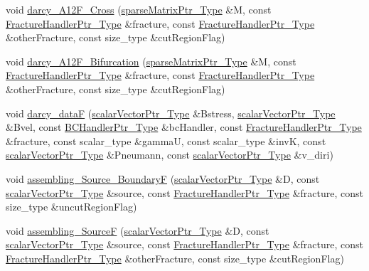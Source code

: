 \begin{DoxyCompactItemize}
\item 
void \hyperlink{namespacegetfem_a88df6c0cb0765d5ab0fae27679cd30f4}{darcy\-\_\-\-A12\-F\-\_\-\-Cross} (\hyperlink{Core_8h_a87137a9501b38c724ac80bc955164bb7}{sparse\-Matrix\-Ptr\-\_\-\-Type} \&M, const \hyperlink{FractureHandler_8h_af23fb7a30aaff864bd42587af4f1e78a}{Fracture\-Handler\-Ptr\-\_\-\-Type} \&fracture, const \hyperlink{FractureHandler_8h_af23fb7a30aaff864bd42587af4f1e78a}{Fracture\-Handler\-Ptr\-\_\-\-Type} \&other\-Fracture, const size\-\_\-type \&cut\-Region\-Flag)
\item 
void \hyperlink{namespacegetfem_a8ec373049ba9d4784a98751bc4134221}{darcy\-\_\-\-A12\-F\-\_\-\-Bifurcation} (\hyperlink{Core_8h_a87137a9501b38c724ac80bc955164bb7}{sparse\-Matrix\-Ptr\-\_\-\-Type} \&M, const \hyperlink{FractureHandler_8h_af23fb7a30aaff864bd42587af4f1e78a}{Fracture\-Handler\-Ptr\-\_\-\-Type} \&fracture, const \hyperlink{FractureHandler_8h_af23fb7a30aaff864bd42587af4f1e78a}{Fracture\-Handler\-Ptr\-\_\-\-Type} \&other\-Fracture, const size\-\_\-type \&cut\-Region\-Flag)
\item 
void \hyperlink{namespacegetfem_ad6e90b309c01f6b4fc91c9369cba376a}{darcy\-\_\-data\-F} (\hyperlink{Core_8h_ab09b6fa3c23db1b8c60456f8690c44a7}{scalar\-Vector\-Ptr\-\_\-\-Type} \&Bstress, \hyperlink{Core_8h_ab09b6fa3c23db1b8c60456f8690c44a7}{scalar\-Vector\-Ptr\-\_\-\-Type} \&Bvel, const \hyperlink{BCHandler_8h_aa175884cb453788647f17f2230a2a762}{B\-C\-Handler\-Ptr\-\_\-\-Type} \&bc\-Handler, const \hyperlink{FractureHandler_8h_af23fb7a30aaff864bd42587af4f1e78a}{Fracture\-Handler\-Ptr\-\_\-\-Type} \&fracture, const scalar\-\_\-type \&gamma\-U, const scalar\-\_\-type \&inv\-K, const \hyperlink{Core_8h_ab09b6fa3c23db1b8c60456f8690c44a7}{scalar\-Vector\-Ptr\-\_\-\-Type} \&Pneumann, const \hyperlink{Core_8h_ab09b6fa3c23db1b8c60456f8690c44a7}{scalar\-Vector\-Ptr\-\_\-\-Type} \&v\-\_\-diri)
\item 
void \hyperlink{namespacegetfem_ac08fe08fb325eede94ffe4968b7980de}{assembling\-\_\-\-Source\-\_\-\-Boundary\-F} (\hyperlink{Core_8h_ab09b6fa3c23db1b8c60456f8690c44a7}{scalar\-Vector\-Ptr\-\_\-\-Type} \&D, const \hyperlink{Core_8h_ab09b6fa3c23db1b8c60456f8690c44a7}{scalar\-Vector\-Ptr\-\_\-\-Type} \&source, const \hyperlink{FractureHandler_8h_af23fb7a30aaff864bd42587af4f1e78a}{Fracture\-Handler\-Ptr\-\_\-\-Type} \&fracture, const size\-\_\-type \&uncut\-Region\-Flag)
\item 
void \hyperlink{namespacegetfem_a5efeefe94dfb5427c3ecf63d0b342c57}{assembling\-\_\-\-Source\-F} (\hyperlink{Core_8h_ab09b6fa3c23db1b8c60456f8690c44a7}{scalar\-Vector\-Ptr\-\_\-\-Type} \&D, const \hyperlink{Core_8h_ab09b6fa3c23db1b8c60456f8690c44a7}{scalar\-Vector\-Ptr\-\_\-\-Type} \&source, const \hyperlink{FractureHandler_8h_af23fb7a30aaff864bd42587af4f1e78a}{Fracture\-Handler\-Ptr\-\_\-\-Type} \&fracture, const \hyperlink{FractureHandler_8h_af23fb7a30aaff864bd42587af4f1e78a}{Fracture\-Handler\-Ptr\-\_\-\-Type} \&other\-Fracture, const size\-\_\-type \&cut\-Region\-Flag)

\end{DoxyCompactItemize}
